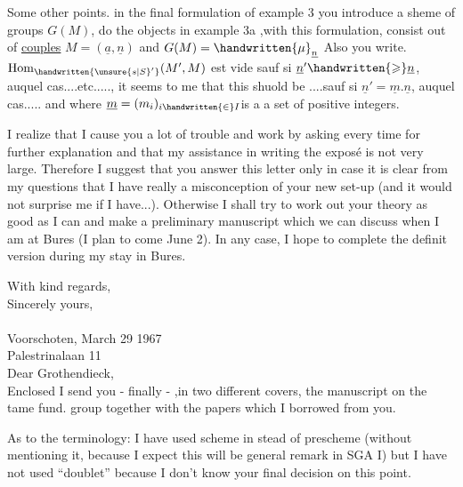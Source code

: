 Some other points. in the final formulation of example 3 you introduce a sheme of groups $G(M)$,  do the objects in example 3a ,with this formulation, consist out of \uline{couples} $M=(\underline{a},\underline{n})$ and $G(M)=\handwritten{\mu}_{\underline{n}}$  Also you write. $\mathrm{Hom}_{\handwritten{\unsure{s|S}'}}(M',M)$ est vide sauf si $\underline{n}'\handwritten{\geqslant}\underline{n}$, auquel cas....etc....., it seems to me that this shuold be ....sauf si $\underline{n}'=\underline{m}.\underline{n}$, auquel cas..... and where $\underline{m}=(m_i)_{i\handwritten{\in}I}$is a a set of positive integers.


I realize that I cause you a lot of trouble and work by asking every time for further explanation and that my assistance in writing the exposé is not very large. Therefore I suggest that you answer this letter only in case it is clear from my questions that I have really a misconception of your new set-up (and it would not surprise me if I have...). Otherwise I shall try to work out your theory as good as I can and make a preliminary manuscript which we can discuss when I am at Bures (I plan to come June 2). In any case, I hope to complete the definit version during my stay in Bures.

With kind regards,\\
Sincerely yours,\\
\\

Voorschoten, March 29 1967\\
Palestrinalaan 11\\

Dear Grothendieck,\\

Enclosed I send you - finally - ,in two different covers, the manuscript on the tame fund. group together with the papers which I borrowed from you.

As to the terminology: I have used scheme in stead of prescheme (without mentioning it, because I expect this will be  general remark in SGA I) but I have not used ``doublet'' because I don't know your final decision on this point.

